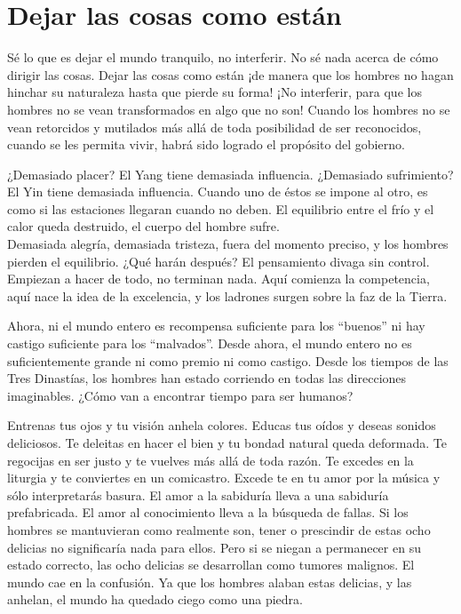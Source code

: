 \documentclass[book,b5paper,hidelinks,final]{memoir}
\begin{document}
	\chapter*{Dejar las cosas como están}
	
	Sé lo que es dejar el mundo tranquilo, no interferir. No sé nada acerca
	de cómo dirigir las cosas. Dejar las cosas como están ¡de manera que los
	hombres no hagan hinchar su naturaleza hasta que pierde su forma! ¡No
	interferir, para que los hombres no se vean transformados en algo que no
	son! Cuando los hombres no se vean retorcidos y mutilados más allá de
	toda posibilidad de ser reconocidos, cuando se les permita vivir, habrá
	sido logrado el propósito del gobierno.
	
	¿Demasiado placer? El Yang tiene demasiada influencia. ¿Demasiado
	sufrimiento? El Yin tiene demasiada influencia. Cuando uno de éstos se
	impone al otro, es como si las estaciones llegaran cuando no deben. El
	equilibrio entre el frío y el calor queda destruido, el cuerpo del
	hombre sufre.\\
	Demasiada alegría, demasiada tristeza, fuera del momento preciso, y los
	hombres pierden el equilibrio. ¿Qué harán después? El pensamiento divaga
	sin control. Empiezan a hacer de todo, no terminan nada. Aquí comienza
	la competencia, aquí nace la idea de la excelencia, y los ladrones
	surgen sobre la faz de la Tierra.
	
	Ahora, ni el mundo entero es recompensa suficiente para los ``buenos''
	ni hay castigo suficiente para los ``malvados''. Desde ahora, el mundo
	entero no es suficientemente grande ni como premio ni como castigo.
	Desde los tiempos de las Tres Dinastías, los hombres han estado
	corriendo en todas las direcciones imaginables. ¿Cómo van a encontrar
	tiempo para ser humanos?
	
	Entrenas tus ojos y tu visión anhela colores. Educas tus oídos y deseas
	sonidos deliciosos. Te deleitas en hacer el bien y tu bondad natural
	queda deformada. Te regocijas en ser justo y te vuelves más allá de toda
	razón. Te excedes en la liturgia y te conviertes en un comicastro.
	Excede te en tu amor por la música y sólo interpretarás basura. El amor
	a la sabiduría lleva a una sabiduría prefabricada. El amor al
	conocimiento lleva a la búsqueda de fallas. Si los hombres se
	mantuvieran como realmente son, tener o prescindir de estas ocho
	delicias no significaría nada para ellos. Pero si se niegan a permanecer
	en su estado correcto, las ocho delicias se desarrollan como tumores
	malignos. El mundo cae en la confusión. Ya que los hombres alaban estas
	delicias, y las anhelan, el mundo ha quedado ciego como una piedra.
	
\end{document}
